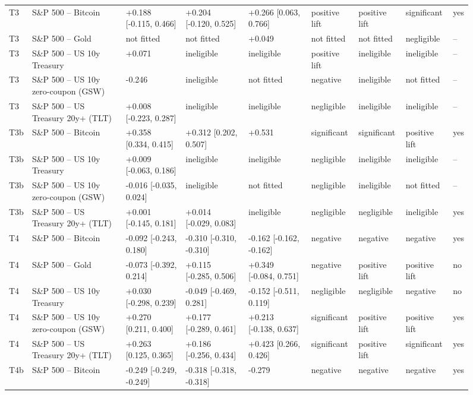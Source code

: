 \begin{figure}[t]
{\begin{tabular}{lllllllll}
T3 & S\&P 500 -- Bitcoin & +0.188 [-0.115, 0.466] & +0.204 [-0.120, 0.525] & +0.266 [0.063, 0.766] & positive lift & positive lift & significant & yes \\
T3 & S\&P 500 -- Gold & not fitted & not fitted & +0.049 & not fitted & not fitted & negligible & -- \\
T3 & S\&P 500 -- US 10y Treasury & +0.071 & ineligible & ineligible & positive lift & ineligible & ineligible & -- \\
T3 & S\&P 500 -- US 10y zero-coupon (GSW) & -0.246 & ineligible & not fitted & negative & ineligible & not fitted & -- \\
T3 & S\&P 500 -- US Treasury 20y+ (TLT) & +0.008 [-0.223, 0.287] & ineligible & ineligible & negligible & ineligible & ineligible & -- \\
T3b & S\&P 500 -- Bitcoin & +0.358 [0.334, 0.415] & +0.312 [0.202, 0.507] & +0.531 & significant & significant & positive lift & yes \\
T3b & S\&P 500 -- US 10y Treasury & +0.009 [-0.063, 0.186] & ineligible & ineligible & negligible & ineligible & ineligible & -- \\
T3b & S\&P 500 -- US 10y zero-coupon (GSW) & -0.016 [-0.035, 0.024] & ineligible & not fitted & negligible & ineligible & not fitted & -- \\
T3b & S\&P 500 -- US Treasury 20y+ (TLT) & +0.001 [-0.145, 0.181] & +0.014 [-0.029, 0.083] & ineligible & negligible & negligible & ineligible & yes \\
T4 & S\&P 500 -- Bitcoin & -0.092 [-0.243, 0.180] & -0.310 [-0.310, -0.310] & -0.162 [-0.162, -0.162] & negative & negative & negative & yes \\
T4 & S\&P 500 -- Gold & -0.073 [-0.392, 0.214] & +0.115 [-0.285, 0.506] & +0.349 [-0.084, 0.751] & negative & positive lift & positive lift & no \\
T4 & S\&P 500 -- US 10y Treasury & +0.030 [-0.298, 0.239] & -0.049 [-0.469, 0.281] & -0.152 [-0.511, 0.119] & negligible & negligible & negative & no \\
T4 & S\&P 500 -- US 10y zero-coupon (GSW) & +0.270 [0.211, 0.400] & +0.177 [-0.289, 0.461] & +0.213 [-0.138, 0.637] & significant & positive lift & positive lift & yes \\
T4 & S\&P 500 -- US Treasury 20y+ (TLT) & +0.263 [0.125, 0.365] & +0.186 [-0.256, 0.434] & +0.423 [0.266, 0.426] & significant & positive lift & significant & yes \\
T4b & S\&P 500 -- Bitcoin & -0.249 [-0.249, -0.249] & -0.318 [-0.318, -0.318] & -0.279 & negative & negative & negative & yes \\

\end{tabular}}
\end{figure}
